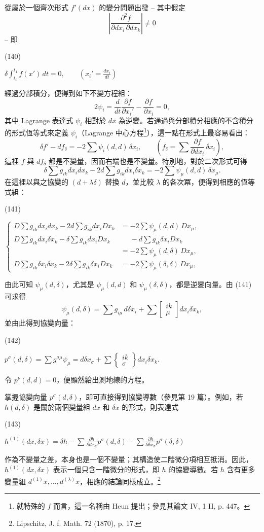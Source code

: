 \documentclass[11pt]{article}
\providecommand{\srcnumdisplay}[3][3.4em]{%
  \par\smallskip\noindent
  \begin{minipage}[t]{#1}\vspace*{0pt}#2\end{minipage}%
  \begin{minipage}[t]{\dimexpr\linewidth-#1\relax}\vspace*{0pt}\centering
  \(\displaystyle #3\)
  \end{minipage}\par\smallskip}
\begin{document}
從屬於一個齊次形式 $f'(dx)$ 的變分問題出發 -- 其中假定
\[
\left|\frac{\partial^2 f}{\partial dx_i\,\partial dx_k}\right|\ne0
\]
-- 即
\srcnumdisplay{(140)}{\delta\int_{t_0}^{t_1} f(x')\,dt=0,
\qquad \left(x_i'=\frac{dx_i}{dt}\right)}
經過分部積分，便得到如下不變方程組：
\[
 2\psi_i=\frac{d}{dt}\frac{\partial f}{\partial x_i'}-\frac{\partial f}{\partial x_i}=0,
\]
其中 Lagrange 表達式 $\psi_i$ 相對於 $dx$ 為逆變。若通過與分部積分相應的不含積分的形式恆等式來定義 $\psi_i$（Lagrange 中心方程\footnote{就特殊的 $f$ 而言，這一名稱由 Heun 提出；參見其論文 IV, 1 II, p. 447。}），這一點在形式上最容易看出：
\[
 \delta f'-df_\delta=-2\sum\psi_i(d,d)\,\delta x_i,
 \qquad
 \left(f_\delta=\sum\frac{\partial f}{\partial dx_i}\,\delta x_i\right),
\]
這裡 $f$ 與 $df_\delta$ 都是不變量，因而右端也是不變量。特別地，對於二次形式可得
\[
 \delta\sum g_{ik}dx_i dx_k-2d\sum g_{ik}dx_i\delta x_k
 =-2\sum\psi_\mu(d,d)\,\delta x_\mu.
\]
在這裡以與之協變的 $(d+\lambda\delta)$ 替換 $d$，並比較 $\lambda$ 的各次冪，便得到相應的恆等式組：
\srcnumdisplay{(141)}{\left\{
\begin{aligned}
D\sum g_{ik}dx_i dx_k-2d\sum g_{ik}dx_iDx_k
   &=-2\sum\psi_\mu(d,d)\,Dx_\mu,\\
D\sum g_{ik}dx_i\delta x_k-\delta\sum g_{ik}dx_iDx_k
   &\phantom{={}}{}-d\sum g_{ik}\delta x_iDx_k\\
   &=-2\sum\psi_\mu(d,\delta)\,Dx_\mu,\\
D\sum g_{ik}\delta x_i\delta x_k-2\delta\sum g_{ik}\delta x_iDx_k
   &=-2\sum\psi_\mu(\delta,\delta)\,Dx_\mu,
\end{aligned}
\right.}
由此可知 $\psi_\mu(d,\delta)$，尤其是 $\psi_\mu(d,d)$ 和 $\psi_\mu(\delta,\delta)$，都是逆變向量。由 (141) 可求得
\[
 \psi_\mu(d,\delta)=\sum g_{i\mu}\,d\delta x_i+
 \sum\left[\begin{smallmatrix}ik\\ \mu\end{smallmatrix}\right]dx_i\delta x_k,
\]
並由此得到協變向量：
\srcnumdisplay{(142)}{p^\sigma(d,\delta)=\sum g^{\sigma\mu}\psi_\mu
=d\delta x_\sigma+
\sum\left\{\begin{smallmatrix}ik\\ \sigma\end{smallmatrix}\right\}dx_i\delta x_k.}
令 $p^\nu(d,d)=0$，便顯然給出測地線的方程。

掌握協變向量 $p^\sigma(d,\delta)$，即可直接得到協變導數（參見第 19 篇）。例如，若 $h(d,\delta)$ 是關於兩個變量組 $dx$ 和 $\delta x$ 的形式，則表達式
\srcnumdisplay{(143)}{h^{(1)}(dx,\delta x)=\delta h-
\sum\frac{\partial h}{\partial dx_\sigma}p^\sigma(d,\delta)-
\sum\frac{\partial h}{\partial \delta x_\sigma}p^\sigma(\delta,\delta)}
作為不變量之差，本身也是一個不變量；其構造使二階微分項相互抵消。因此，$h^{(1)}(dx,\delta x)$ 表示一個只含一階微分的形式，即 $h$ 的協變導數。若 $h$ 含有更多變量組 $d^{(1)}x,\ldots,d^{(\lambda)}x$，相應的結論同樣成立。\footnote{Lipschitz, J. f. Math. 72 (1870), p. 17.}
\end{document}
